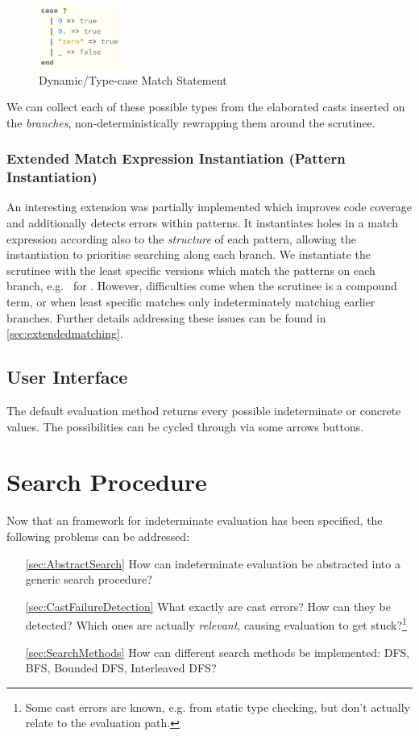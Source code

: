 \begin{figure}[h]
\centering
\includegraphics[width=0.25\textwidth]{Media/Figures/dynmatch}
\caption{Dynamic/Type-case Match Statement}
\label{fig:DynamicPatternMatching}
\end{figure}
We can collect each of these possible types from the elaborated casts inserted on the \textit{branches}, non-deterministically rewrapping them around the scrutinee.

\subsubsection{Extended Match Expression Instantiation (Pattern Instantiation)}
\label{sec:ExtendedPatternMatching}
An interesting extension was partially implemented which improves code coverage and additionally detects errors within patterns. It instantiates holes in a match expression according also to the \textit{structure} of each pattern, allowing the instantiation to prioritise searching along each branch. We instantiate the scrutinee with the least specific versions which match the patterns on each branch, e.g. \dyn\code{::}\dyn\ for . However, difficulties come when the scrutinee is a compound term, or when least specific matches only indeterminately matching earlier branches. Further details addressing these issues can be found in \cref{sec:extendedmatching}.

\subsection{User Interface}\label{sec:UIIndetEval}
The default evaluation method returns every possible indeterminate or concrete values. The possibilities can be cycled through via some arrows buttons.

\section{Search Procedure}\label{sec:SearchProcedure}
Now that an framework for indeterminate evaluation has been specified, the following problems can be addressed:
\begin{itemize}
\item[\ref{sec:AbstractSearch}] How can indeterminate evaluation be abstracted into a generic search procedure?
\item[\ref{sec:CastFailureDetection}] What exactly are cast errors? How can they be detected? Which ones are actually \textit{relevant}, causing evaluation to get stuck?\footnote{Some cast errors are known, e.g. from static type checking, but don't actually relate to the evaluation path.}
\item[\ref{sec:SearchMethods}] How can different search methods be implemented: DFS, BFS, Bounded DFS, Interleaved DFS? 
\end{itemize}

